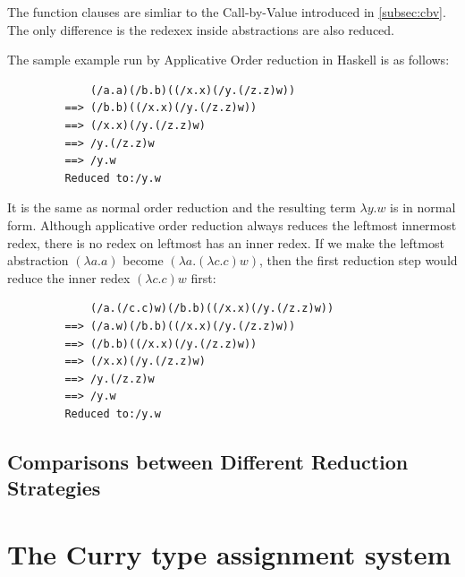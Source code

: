 \documentclass[a4paper,11pt,twoside]{report}
\begin{document}
The function clauses are simliar to the Call-by-Value introduced in \ref{subsec:cbv}. The only difference is the redexex inside abstractions are also reduced.


The sample example run by Applicative Order reduction in Haskell is as follows:

\begin{verbatim}
             (/a.a)(/b.b)((/x.x)(/y.(/z.z)w))
         ==> (/b.b)((/x.x)(/y.(/z.z)w))
         ==> (/x.x)(/y.(/z.z)w)
         ==> /y.(/z.z)w
         ==> /y.w
         Reduced to:/y.w
\end{verbatim}

It is the same as normal order reduction and the resulting term $\lambda y.w$ is in normal form. Although applicative order reduction always reduces the leftmost innermost redex, there is no redex on leftmost has an inner redex. If we make the leftmost abstraction $(\lambda a.a)$ become $(\lambda a.(\lambda c.c)w)$, then the first reduction step would reduce the inner redex $(\lambda c.c)w$ first:

\begin{verbatim}
             (/a.(/c.c)w)(/b.b)((/x.x)(/y.(/z.z)w))
         ==> (/a.w)(/b.b)((/x.x)(/y.(/z.z)w))
         ==> (/b.b)((/x.x)(/y.(/z.z)w))
         ==> (/x.x)(/y.(/z.z)w)
         ==> /y.(/z.z)w
         ==> /y.w
         Reduced to:/y.w
\end{verbatim}


\section{Comparisons between Different Reduction Strategies }








\chapter{The Curry type assignment system}
\end{document}

